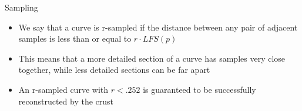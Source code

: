 \begin{frame}{Sampling}
	\begin{itemize}
		\item We say that a curve is r-sampled if the distance between any pair of adjacent samples is less than or equal to $r\cdot LFS(p)$
		\item This means that a more detailed section of a curve has samples very close together, while less detailed sections can be far apart
		\item An r-sampled curve with $r < .252$ is guaranteed to be successfully reconstructed by the crust
	\end{itemize}
	
\end{frame}
